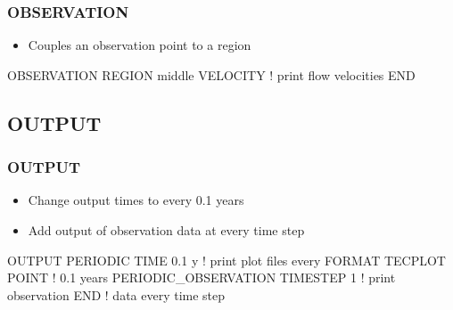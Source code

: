 \documentclass{beamer}
\newcommand\bluecomment[1]{{{\color{blue} #1}}}
\newcommand\magentacomment[1]{{{\color{magenta} #1}}}
\begin{document}
\begin{frame}[fragile]\frametitle{OBSERVATION}

\begin{itemize}
\item Couples an observation point to a region
\end{itemize}

\begin{semiverbatim}

\magentacomment{
OBSERVATION
  REGION middle
  VELOCITY      \bluecomment{! print flow velocities}
END}

\end{semiverbatim}

\end{frame}

\subsection{OUTPUT}

\begin{frame}[fragile]\frametitle{OUTPUT}

\begin{itemize}
\item Change output times to every 0.1 years
\item Add output of observation data at every time step
\end{itemize}


\begin{semiverbatim}

OUTPUT
  \magentacomment{PERIODIC TIME 0.1 y}        \bluecomment{! print plot files every}
  FORMAT TECPLOT POINT       \bluecomment{!   0.1 years}
  \magentacomment{PERIODIC_OBSERVATION TIMESTEP 1} \bluecomment{! print observation}
END                               \bluecomment{!   data every time step}

\end{semiverbatim}

\end{frame}
\end{document}
